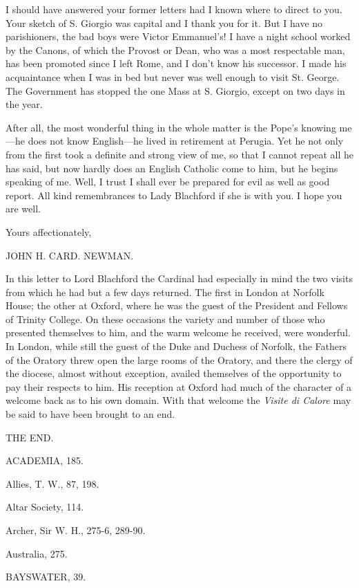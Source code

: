 I should have answered your former letters had I known where to
direct to you. Your sketch of S. Giorgio was capital and I thank you
for it. But I have no parishioners, the bad boys were Victor Emmanuel's!
I have a night school worked by the Canons, of which the Provost or
Dean, who was a most respectable man, has been promoted since I left
Rome, and I don't know his successor. I made his acquaintance when I
was in bed but never was well enough to visit St. George. The
Government has stopped the one Mass at S. Giorgio, except on two days
in the year.

After all, the most wonderful thing in the whole matter is the Pope's
knowing me—he does not know English—he lived in retirement at
Perugia. Yet he not only from the first took a definite and strong
view of me, so that I cannot repeat all he has said, but now hardly
does an English Catholic come to him, but he begins speaking of me.
Well, I trust I shall ever be prepared for evil as well as good
report. All kind remembrances to Lady Blachford if she is with you. I
hope you are well.

Yours affectionately,

JOHN H. CARD. NEWMAN.

In this letter to Lord Blachford the Cardinal had especially in
mind the two visits from which he had but a few days returned. The
first in London at Norfolk House; the other at Oxford, where he was
the guest of the President and Fellows of Trinity College. On these
occasions the variety and number of those who presented
themselves to him, and the warm welcome he received, were wonderful.
In London, while still the guest of the Duke and Duchess of Norfolk,
the Fathers of the Oratory threw open the large rooms of the Oratory,
and there the clergy of the diocese, almost without exception, availed
themselves of the opportunity to pay their respects to him. His
reception at Oxford had much of the character of a welcome back as to
his own domain. With that welcome the \emph{Visite di Calore} may be
said to have been brought to an end.

THE END.


ACADEMIA, 185.

Allies, T. W., 87, 198.

Altar Society, 114.

Archer, Sir W. H., 275-6, 289-90.

Australia, 275.

BAYSWATER, 39.

